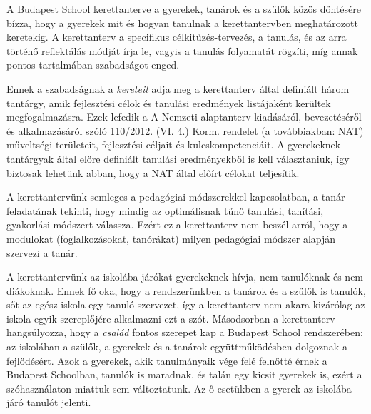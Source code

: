 A Budapest School kerettanterve a gyerekek, tanárok és a szülők közös döntésére
bízza, hogy a gyerekek mit és hogyan tanulnak a kerettantervben meghatározott
keretekig.
A kerettanterv
a specifikus célkitűzés-tervezés, a tanulás, és az arra történő reflektálás
módját írja le, vagyis a tanulás folyamatát rögzíti, míg annak pontos
tartalmában szabadságot enged.

Ennek a szabadságnak a \emph{kereteit} adja meg a kerettanterv által definiált
három tantárgy, amik fejlesztési célok és tanulási eredmények listájaként
kerültek megfogalmazásra. Ezek
lefedik a A Nemzeti alaptanterv kiadásáról, bevezetéséről és alkalmazásáról
szóló 110/2012. (VI. 4.) Korm. rendelet (a továbbiakban: NAT) műveltségi
területeit, fejlesztési céljait és kulcskompetenciáit. A gyerekeknek tantárgyak
által előre definiált tanulási eredményekből is kell
választaniuk, így biztosak lehetünk abban, hogy a NAT által előírt célokat
teljesítik.

A kerettantervünk semleges a pedagógiai módszerekkel kapcsolatban, a tanár
feladatának tekinti, hogy mindig az optimálisnak tűnő tanulási, tanítási,
gyakorlási módszert válassza. Ezért ez a kerettanterv nem beszél arról, hogy a
modulokat (foglalkozásokat, tanórákat) milyen pedagógiai módszer alapján
szervezi a tanár.

A kerettantervünk az iskolába járókat gyerekeknek hívja, nem tanulóknak és nem
diákoknak. Ennek fő oka, hogy a rendszerünkben a tanárok és a szülők is
tanulók, sőt az egész iskola egy tanuló szervezet, így a kerettanterv nem akara  kizárólag
az iskola egyik szereplőjére alkalmazni ezt a szót. Másodsorban a kerettanterv
hangsúlyozza, hogy a \emph{család} fontos szerepet kap a Budapest School
rendszerében: az iskolában a szülők, a gyerekek és a tanárok együttműködésben dolgoznak
a fejlődésért. Azok a gyerekek, akik tanulmányaik vége felé felnőtté érnek a
Budapest Schoolban, tanulók is maradnak, és talán egy kicsit gyerekek is, ezért
a szóhasználaton miattuk sem változtatunk. Az ő esetükben a gyerek az iskolába
járó tanulót jelenti.


